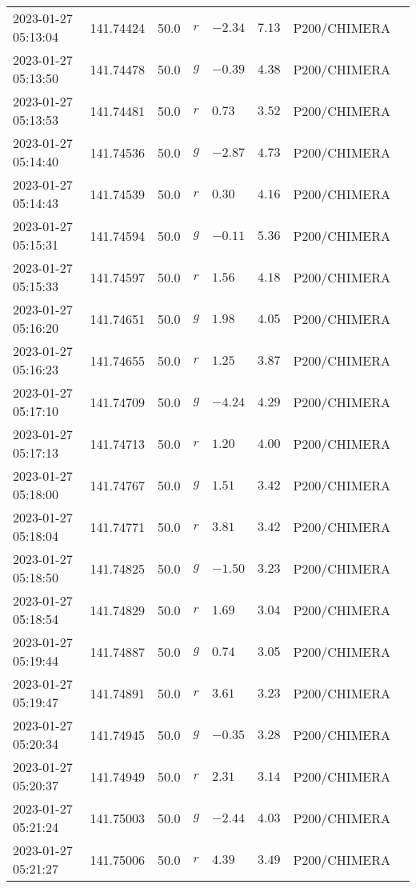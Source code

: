 \documentclass{nature_plusfigure}
\begin{document}
\begin{supplement}
\begin{center}
\begin{longtable}{llllllll}
2023-01-27 05:13:04 & 141.74424 & 50.0 & $r$ & $-2.34$ & $7.13$ & P200/CHIMERA &  \\ 
2023-01-27 05:13:50 & 141.74478 & 50.0 & $g$ & $-0.39$ & $4.38$ & P200/CHIMERA &  \\ 
2023-01-27 05:13:53 & 141.74481 & 50.0 & $r$ & $0.73$ & $3.52$ & P200/CHIMERA &  \\ 
2023-01-27 05:14:40 & 141.74536 & 50.0 & $g$ & $-2.87$ & $4.73$ & P200/CHIMERA &  \\ 
2023-01-27 05:14:43 & 141.74539 & 50.0 & $r$ & $0.30$ & $4.16$ & P200/CHIMERA &  \\ 
2023-01-27 05:15:31 & 141.74594 & 50.0 & $g$ & $-0.11$ & $5.36$ & P200/CHIMERA &  \\ 
2023-01-27 05:15:33 & 141.74597 & 50.0 & $r$ & $1.56$ & $4.18$ & P200/CHIMERA &  \\ 
2023-01-27 05:16:20 & 141.74651 & 50.0 & $g$ & $1.98$ & $4.05$ & P200/CHIMERA &  \\ 
2023-01-27 05:16:23 & 141.74655 & 50.0 & $r$ & $1.25$ & $3.87$ & P200/CHIMERA &  \\ 
2023-01-27 05:17:10 & 141.74709 & 50.0 & $g$ & $-4.24$ & $4.29$ & P200/CHIMERA &  \\ 
2023-01-27 05:17:13 & 141.74713 & 50.0 & $r$ & $1.20$ & $4.00$ & P200/CHIMERA &  \\ 
2023-01-27 05:18:00 & 141.74767 & 50.0 & $g$ & $1.51$ & $3.42$ & P200/CHIMERA &  \\ 
2023-01-27 05:18:04 & 141.74771 & 50.0 & $r$ & $3.81$ & $3.42$ & P200/CHIMERA &  \\ 
2023-01-27 05:18:50 & 141.74825 & 50.0 & $g$ & $-1.50$ & $3.23$ & P200/CHIMERA &  \\ 
2023-01-27 05:18:54 & 141.74829 & 50.0 & $r$ & $1.69$ & $3.04$ & P200/CHIMERA &  \\ 
2023-01-27 05:19:44 & 141.74887 & 50.0 & $g$ & $0.74$ & $3.05$ & P200/CHIMERA &  \\ 
2023-01-27 05:19:47 & 141.74891 & 50.0 & $r$ & $3.61$ & $3.23$ & P200/CHIMERA &  \\ 
2023-01-27 05:20:34 & 141.74945 & 50.0 & $g$ & $-0.35$ & $3.28$ & P200/CHIMERA &  \\ 
2023-01-27 05:20:37 & 141.74949 & 50.0 & $r$ & $2.31$ & $3.14$ & P200/CHIMERA &  \\ 
2023-01-27 05:21:24 & 141.75003 & 50.0 & $g$ & $-2.44$ & $4.03$ & P200/CHIMERA &  \\ 
2023-01-27 05:21:27 & 141.75006 & 50.0 & $r$ & $4.39$ & $3.49$ & P200/CHIMERA &  \\ 

\end{longtable}
\end{center}
\end{supplement}
\end{document}
